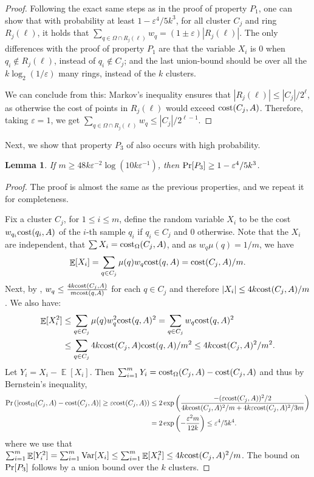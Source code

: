 \documentclass[11pt]{article}
\newtheorem{lemma}{Lemma}[section]
\theoremstyle{restate}
\theoremstyle{definition}
\newcommand{\eps}{\ensuremath{\varepsilon}}
\DeclareMathOperator*{\var}{\mathrm{Var}}
\DeclareMathOperator*{\Prob}{\ensuremath{\textnormal{Pr}}}
\renewcommand{\Pr}{\Prob}
\newcommand{\E}{\mathop{\mathbb{E}}}
\newcommand{\cost}{\textnormal{cost}}
\newcommand{\costom}{\cost_\Omega} %
\newcommand{\csize}{m}
\begin{document}
\begin{proof}
    Following the exact same steps as in the proof of property $P_1$, one can show that with probability at least $1-\eps^4/5k^3$, for all cluster $C_j$ and ring $R_j(\ell)$, it holds that $\sum_{q \in \Omega \cap R_j(\ell)} w_q = (1\pm \eps) |R_j(\ell)|$. 
    The only differences with the proof of property $P_1$ are that the variable $X_i$ is 0 when $q_i \notin R_j(\ell)$, instead of $q_i \notin C_j$; and the last union-bound should be over all the $k \log_2(1/\eps)$ many rings, instead of the $k$ clusters. 
    
    We can conclude from this: Markov's inequality ensures that $|R_j(\ell)| \leq |C_j|/2^\ell$, as otherwise the cost of points in $R_j(\ell)$ would exceed $\cost(C_j, A)$. Therefore, taking $\eps = 1$, we get $\sum_{q \in \Omega \cap R_j(\ell)} w_q \leq |C_j|/2^{\ell-1}$.
\end{proof}

Next, we show that property $P_3$ of  also occurs with high probability. 
\begin{lemma}
    If $\csize \geq 48 k\eps^{-2} \log(10k\eps^{-1})$, then $\Pr[P_3] \geq 1 - \eps^4/5k^3$.
\end{lemma}
\begin{proof}
The proof is almost the same as the previous properties, and we repeat it for completeness.

 Fix a cluster $C_j$, 
for $1 \leq i \leq \csize$, define the random variable $X_i$ to be the cost $w_{q_i} \cost(q_i, A)$ of the $i$-th sample $q_i$ if $q_i \in C_j$ and $0$ otherwise. Note that the $X_i$ are independent, that $\sum X_i = \costom
(C_j, A)$, and as  $w_q \mu(q)=1/\csize$,  we have
\[\E[X_i] = \sum_{q \in C_j}  \mu(q) w_q \cost(q, A) = \cost(C_j, A)/\csize.\]
Next, by , $w_q \leq \frac{4k \cost(C_j, A)}{\csize \cost(q, A)}$ for each $q\in C_j$ and therefore $|X_i| \leq 4k \cost(C_j, A) / \csize$. We also have: 
\begin{align*}
\E[X_i^2] &\leq  \sum_{q \in C_j} \mu(q) w_q^2 \cost(q, A)^2 
= \sum_{q \in C_j} w_q \cost(q, A)^2\\
&\leq \sum_{q \in C_j} 4k \cost(C_j, A) \cost(q, A)/\csize^2  \leq 4k\cost(C_j, A)^2 /\csize^2.    
\end{align*}
Let $Y_i = X_i - \E[X_i]$. Then $\sum_{i=1}^\csize Y_i = \costom(C_j, A) - \cost(C_j, A)$  and thus by
 Bernstein's inequality,
	\begin{align*}
		\Pr \left(|\costom(C_j, A) - \cost(C_j, A)| \geq \eps \cost(C_j, A)\right) &
		\leq 2\exp\left(\frac{-(\eps \cost(C_j, A))^2/2}{4k\cost(C_j, A)^2 /\csize + 4k\eps\cost(C_j, A)^2/3\csize}\right)\\ 
		&= 2\exp\left(- \frac{\eps^2 \csize}{12k}\right) \leq \eps^4/5k^4.
	\end{align*}
where we use that $\sum_{i=1}^\csize \E[Y_i^2] = \sum_{i=1}^\csize \var[X_i] \leq  \sum_{i=1}^\csize \E[X_i^2] \leq 4k\cost(C_j, A)^2/\csize$.
The bound on $\Pr[P_3]$ follows by a union bound over the $k$ clusters. 
\end{proof}
\end{document}
